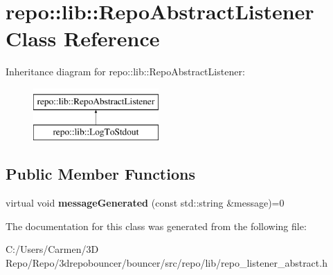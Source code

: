 \hypertarget{classrepo_1_1lib_1_1_repo_abstract_listener}{}\section{repo\+:\+:lib\+:\+:Repo\+Abstract\+Listener Class Reference}
\label{classrepo_1_1lib_1_1_repo_abstract_listener}
Inheritance diagram for repo\+:\+:lib\+:\+:Repo\+Abstract\+Listener\+:\begin{figure}[H]
\begin{center}
\leavevmode
\includegraphics[height=2.000000cm]{classrepo_1_1lib_1_1_repo_abstract_listener}
\end{center}
\end{figure}
\subsection*{Public Member Functions}
\begin{DoxyCompactItemize}
\item 
\hypertarget{classrepo_1_1lib_1_1_repo_abstract_listener_a7b3b335339d33c19c0152021a2ab60b5}{}virtual void {\bfseries message\+Generated} (const std\+::string \&message)=0\label{classrepo_1_1lib_1_1_repo_abstract_listener_a7b3b335339d33c19c0152021a2ab60b5}

\end{DoxyCompactItemize}


The documentation for this class was generated from the following file\+:\begin{DoxyCompactItemize}
\item 
C\+:/\+Users/\+Carmen/3\+D Repo/\+Repo/3drepobouncer/bouncer/src/repo/lib/repo\+\_\+listener\+\_\+abstract.\+h\end{DoxyCompactItemize}
